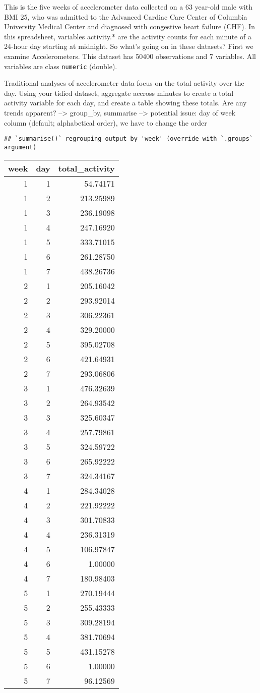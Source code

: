 \documentclass[]{article}
\newenvironment{Shaded}{\begin{snugshade}}{\end{snugshade}}
\newcommand{\DataTypeTok}[1]{\textcolor[rgb]{0.13,0.29,0.53}{#1}}
\newcommand{\KeywordTok}[1]{\textcolor[rgb]{0.13,0.29,0.53}{\textbf{#1}}}
\newcommand{\NormalTok}[1]{#1}
\newcommand{\OperatorTok}[1]{\textcolor[rgb]{0.81,0.36,0.00}{\textbf{#1}}}
\newcommand{\StringTok}[1]{\textcolor[rgb]{0.31,0.60,0.02}{#1}}
\begin{document}
This is the five weeks of accelerometer data collected on a 63 year-old
male with BMI 25, who was admitted to the Advanced Cardiac Care Center
of Columbia University Medical Center and diagnosed with congestive
heart failure (CHF). In this spreadsheet, variables activity.* are the
activity counts for each minute of a 24-hour day starting at midnight.
So what's going on in these datasets? First we examine Accelerometers.
This dataset has 50400 observations and 7 variables. All variables are
class \texttt{numeric} (double).

Traditional analyses of accelerometer data focus on the total activity
over the day. Using your tidied dataset, aggregate accross minutes to
create a total activity variable for each day, and create a table
showing these totals. Are any trends apparent? --\textgreater{}
group\_by, summarise --\textgreater{} potential issue: day of week
column (default; alphabetical order), we have to change the order

\begin{Shaded}
\end{Shaded}

\begin{verbatim}
## `summarise()` regrouping output by 'week' (override with `.groups` argument)
\end{verbatim}

\begin{longtable}[]{@{}rrr@{}}
\toprule
week & day & total\_activity\tabularnewline
\midrule
\endhead
1 & 1 & 54.74171\tabularnewline
1 & 2 & 213.25989\tabularnewline
1 & 3 & 236.19098\tabularnewline
1 & 4 & 247.16920\tabularnewline
1 & 5 & 333.71015\tabularnewline
1 & 6 & 261.28750\tabularnewline
1 & 7 & 438.26736\tabularnewline
2 & 1 & 205.16042\tabularnewline
2 & 2 & 293.92014\tabularnewline
2 & 3 & 306.22361\tabularnewline
2 & 4 & 329.20000\tabularnewline
2 & 5 & 395.02708\tabularnewline
2 & 6 & 421.64931\tabularnewline
2 & 7 & 293.06806\tabularnewline
3 & 1 & 476.32639\tabularnewline
3 & 2 & 264.93542\tabularnewline
3 & 3 & 325.60347\tabularnewline
3 & 4 & 257.79861\tabularnewline
3 & 5 & 324.59722\tabularnewline
3 & 6 & 265.92222\tabularnewline
3 & 7 & 324.34167\tabularnewline
4 & 1 & 284.34028\tabularnewline
4 & 2 & 221.92222\tabularnewline
4 & 3 & 301.70833\tabularnewline
4 & 4 & 236.31319\tabularnewline
4 & 5 & 106.97847\tabularnewline
4 & 6 & 1.00000\tabularnewline
4 & 7 & 180.98403\tabularnewline
5 & 1 & 270.19444\tabularnewline
5 & 2 & 255.43333\tabularnewline
5 & 3 & 309.28194\tabularnewline
5 & 4 & 381.70694\tabularnewline
5 & 5 & 431.15278\tabularnewline
5 & 6 & 1.00000\tabularnewline
5 & 7 & 96.12569\tabularnewline
\bottomrule
\end{longtable}
\end{document}
